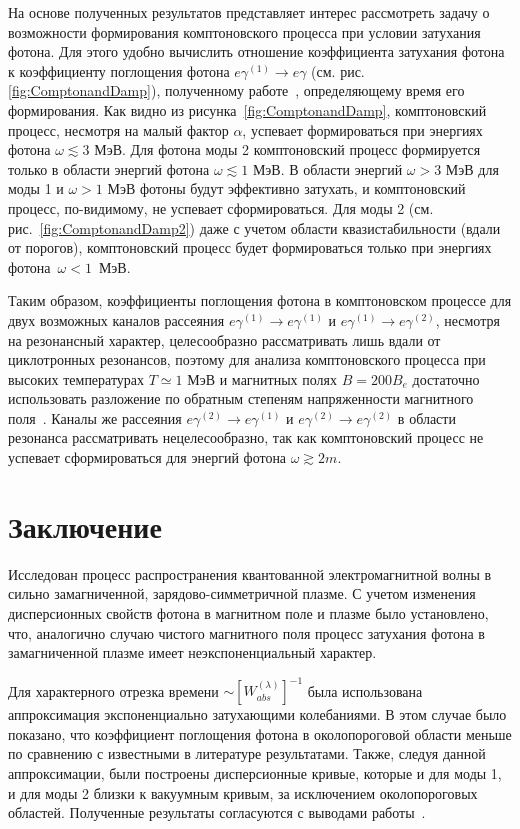 \documentclass[14pt, russian]{article}
\begin{document}
На основе полученных результатов представляет интерес рассмотреть задачу о возможности формирования комптоновского процесса при условии затухания фотона. Для этого удобно вычислить отношение коэффициента затухания фотона к коэффициенту поглощения фотона $e\gamma^{(1)}\to e\gamma$  (см. рис. \ref{fig:ComptonandDamp}), полученному работе~\cite{JETP2026}, определяющему время его формирования. Как видно из рисунка~\ref{fig:ComptonandDamp}, комптоновский процесс, несмотря на малый фактор $\alpha$, успевает формироваться при энергиях фотона $\omega\lesssim3$ МэВ. Для фотона моды 2 комптоновский процесс формируется только в области энергий фотона $\omega\lesssim1$ МэВ. В области энергий $\omega>3$ МэВ для моды 1 и $\omega>1$ МэВ фотоны будут эффективно затухать, и комптоновский процесс, по-видимому, не успевает сформироваться. Для моды 2 (см. рис.~\ref{fig:ComptonandDamp2}) даже с учетом области квазистабильности (вдали от порогов), комптоновский процесс будет формироваться только при энергиях фотона~$\omega<1$~МэВ.

Таким образом, коэффициенты поглощения фотона в комптоновском процессе для двух возможных каналов рассеяния $e\gamma^{(1)}  \to e\gamma^{(1)}$ и $e\gamma^{(1)}  \to e\gamma^{(2)}$, несмотря на резонансный характер, целесообразно рассматривать лишь вдали от циклотронных резонансов, поэтому для анализа комптоновского процесса при высоких температурах $T\simeq 1$ МэВ и магнитных полях $B=200 B_e$ достаточно использовать разложение по обратным степеням напряженности магнитного поля~\cite{Chistyakov:2009}. Каналы же рассеяния $e\gamma^{(2)}  \to e\gamma^{(1)}$  и $e\gamma^{(2)}  \to e\gamma^{(2)}$ в области резонанса рассматривать нецелесообразно, так как комптоновский процесс не успевает сформироваться для энергий фотона $\omega\gtrsim 2m$.
\section{Заключение}

Исследован процесс распространения квантованной электромагнитной волны в сильно замагниченной, зарядово-симметричной плазме. С учетом изменения дисперсионных свойств фотона в магнитном поле и плазме было установлено, что, аналогично случаю чистого магнитного поля процесс затухания фотона
в замагниченной плазме имеет неэкспоненциальный характер. 

Для характерного отрезка времени $\sim [W^{{(\lambda)}}_{abs}]^{-1}$ была использована аппроксимация экспоненциально затухающими колебаниями. В этом случае было
показано, что коэффициент поглощения фотона в околопороговой области меньше по сравнению с известными в литературе результатами. Также, следуя данной аппроксимации, были построены дисперсионные кривые, которые и для моды 1, и для моды 2 близки к вакуумным кривым, за исключением околопороговых областей. Полученные результаты согласуются с выводами работы~\cite{Shabad:1988}.
\end{document}
